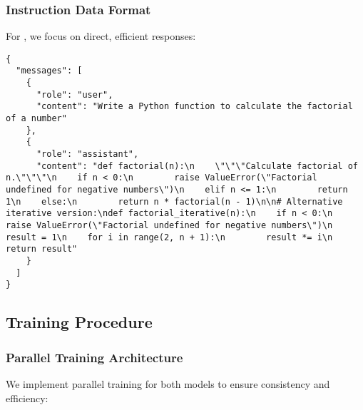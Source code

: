 \subsubsection{Instruction Data Format}

For \zennano{}, we focus on direct, efficient responses:

\begin{lstlisting}[caption=Direct instruction example,label=lst:instruction-format]
{
  "messages": [
    {
      "role": "user",
      "content": "Write a Python function to calculate the factorial of a number"
    },
    {
      "role": "assistant",
      "content": "def factorial(n):\n    \"\"\"Calculate factorial of n.\"\"\"\n    if n < 0:\n        raise ValueError(\"Factorial undefined for negative numbers\")\n    elif n <= 1:\n        return 1\n    else:\n        return n * factorial(n - 1)\n\n# Alternative iterative version:\ndef factorial_iterative(n):\n    if n < 0:\n        raise ValueError(\"Factorial undefined for negative numbers\")\n    result = 1\n    for i in range(2, n + 1):\n        result *= i\n    return result"
    }
  ]
}
\end{lstlisting}

\subsection{Training Procedure}

\subsubsection{Parallel Training Architecture}

We implement parallel training for both models to ensure consistency and efficiency:


